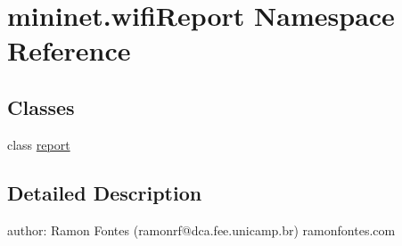 \hypertarget{namespacemininet_1_1wifiReport}{\section{mininet.\-wifi\-Report Namespace Reference}
\label{namespacemininet_1_1wifiReport}
}
\subsection*{Classes}
\begin{DoxyCompactItemize}
\item 
class \hyperlink{classmininet_1_1wifiReport_1_1report}{report}
\end{DoxyCompactItemize}


\subsection{Detailed Description}
\begin{DoxyVerb}author: Ramon Fontes (ramonrf@dca.fee.unicamp.br)
ramonfontes.com\end{DoxyVerb}
 